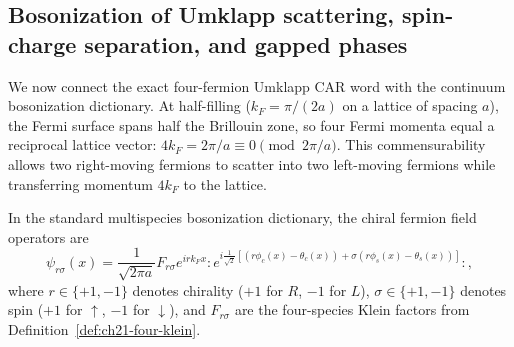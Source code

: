 \subsection*{Bosonization of Umklapp scattering, spin-charge separation, and gapped phases}
\label{subsec:ch21-umklapp-bosonization}

We now connect the exact four-fermion Umklapp CAR word with the continuum
bosonization dictionary.  At half-filling ($k_F = \pi/(2a)$ on a lattice of spacing $a$),
the Fermi surface spans half the Brillouin zone, so four Fermi momenta equal a
reciprocal lattice vector: $4 k_F = 2\pi/a \equiv 0 \pmod{2\pi/a}$.
This commensurability allows two right-moving fermions to scatter into two left-moving
fermions while transferring momentum $4 k_F$ to the lattice.

In the standard multispecies bosonization dictionary, the chiral fermion field operators are
\begin{equation}
 \psi_{r\sigma}(x) = \frac{1}{\sqrt{2\pi a}} F_{r\sigma} e^{i r k_F x}
 :\!e^{i \frac{1}{\sqrt{2}} [ (r \phi_c(x) - \theta_c(x)) + \sigma (r \phi_s(x) - \theta_s(x)) ]}\!:,
 \label{eq:ch21-chiral-fermion-bosonized}
\end{equation}
where $r \in \{+1, -1\}$ denotes chirality ($+1$ for $R$, $-1$ for $L$),
$\sigma \in \{+1, -1\}$ denotes spin ($+1$ for $\uparrow$, $-1$ for $\downarrow$),
and $F_{r\sigma}$ are the four-species Klein factors from Definition~\ref{def:ch21-four-klein}.

